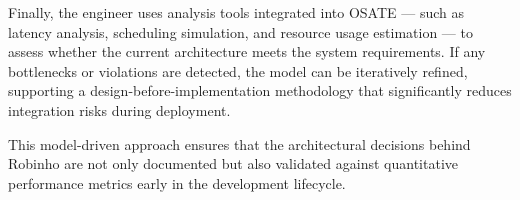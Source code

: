 Finally, the engineer uses analysis tools integrated into OSATE — such as latency analysis, scheduling simulation, and resource usage estimation — to assess whether the current architecture meets the system requirements. If any bottlenecks or violations are detected, the model can be iteratively refined, supporting a design-before-implementation methodology that significantly reduces integration risks during deployment.

This model-driven approach ensures that the architectural decisions behind Robinho are not only documented but also validated against quantitative performance metrics early in the development lifecycle.